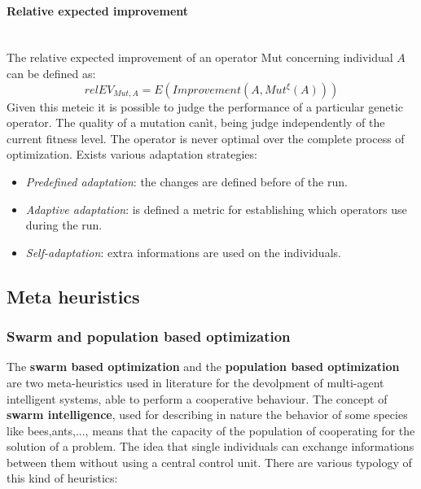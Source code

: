 \documentclass{article}
\begin{document}
\paragraph{Relative expected improvement}\mbox{}\\
The relative expected improvement of an operator Mut concerning individual $A$ can be
defined as:
$$relEV_{Mut,A}=E(Improvement(A,Mut^\xi(A)))$$
Given this meteic it is possible to judge the performance of a particular genetic operator.
The quality of a mutation canìt, being judge independently of the current fitness level.
The operator is never optimal over the complete process of optimization.
\newline\newline
Exists various adaptation strategies:
\begin{itemize}
    \item \textit{Predefined adaptation}: the changes are defined before of the run.
    \item \textit{Adaptive adaptation}: is defined a metric for establishing which operators
          use during the run.
    \item \textit{Self-adaptation}: extra informations are used on the individuals.
\end{itemize}

\subsection{Meta heuristics}
\subsubsection{Swarm and population based optimization}
The \textbf{swarm based optimization} and the \textbf{population based optimization}
are two meta-heuristics used in literature for the devolpment of multi-agent intelligent
systems, able to perform a cooperative behaviour. The concept of \textbf{swarm intelligence},
used for describing in nature the behavior of some species like bees,ants,..., means that
the capacity of the population of cooperating for the solution of a problem. The idea
that single individuals can exchange informations between them without using a central
control unit. There are various typology of this kind of heuristics:
\end{document}
